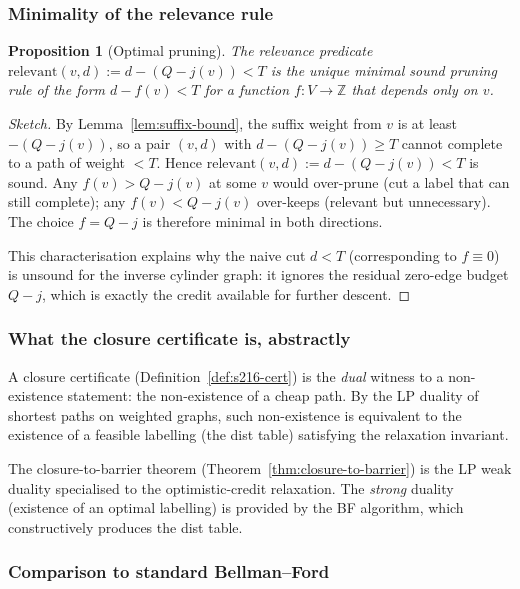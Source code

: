 \documentclass[11pt,a4paper]{article}
\theoremstyle{plain}
\newtheorem{proposition}[theorem]{Proposition}
\theoremstyle{definition}
\newcommand{\ZZ}{\mathbb{Z}}
\newcommand{\relevant}{\mathrm{relevant}}
\begin{document}
\subsubsection*{Minimality of the relevance rule}

\begin{proposition}[Optimal pruning]
\label{prop:optimal-pruning}
The relevance predicate $\relevant(v, d) := d - (Q - j(v)) < T$ is
the \emph{unique} minimal sound pruning rule of the form
$d - f(v) < T$ for a function $f : V \to \ZZ$ that depends only on
$v$.
\end{proposition}

\begin{proof}[Sketch]
By Lemma~\ref{lem:suffix-bound}, the suffix weight from $v$ is at
least $-(Q - j(v))$, so a pair $(v, d)$ with
$d - (Q - j(v)) \ge T$ cannot complete to a path of weight $< T$.
Hence $\relevant(v, d) := d - (Q - j(v)) < T$ is sound. Any
$f(v) > Q - j(v)$ at some $v$ would over-prune (cut a label that
can still complete); any $f(v) < Q - j(v)$ over-keeps (relevant
but unnecessary). The choice $f = Q - j$ is therefore minimal in
both directions.

This characterisation explains why the naive cut $d < T$
(corresponding to $f \equiv 0$) is unsound for the inverse cylinder
graph: it ignores the residual zero-edge budget $Q - j$, which is
exactly the credit available for further descent.
\end{proof}

\subsubsection*{What the closure certificate is, abstractly}

A closure certificate (Definition~\ref{def:s216-cert}) is the
\emph{dual} witness to a non-existence statement: the
non-existence of a cheap path. By the LP duality of shortest paths
on weighted graphs, such non-existence is equivalent to the
existence of a feasible labelling (the dist table) satisfying the
relaxation invariant.

The closure-to-barrier theorem
(Theorem~\ref{thm:closure-to-barrier}) is the LP weak duality
specialised to the optimistic-credit relaxation. The
\emph{strong} duality (existence of an optimal labelling) is
provided by the BF algorithm, which constructively produces the
dist table.

\subsubsection*{Comparison to standard Bellman--Ford}
\end{document}
